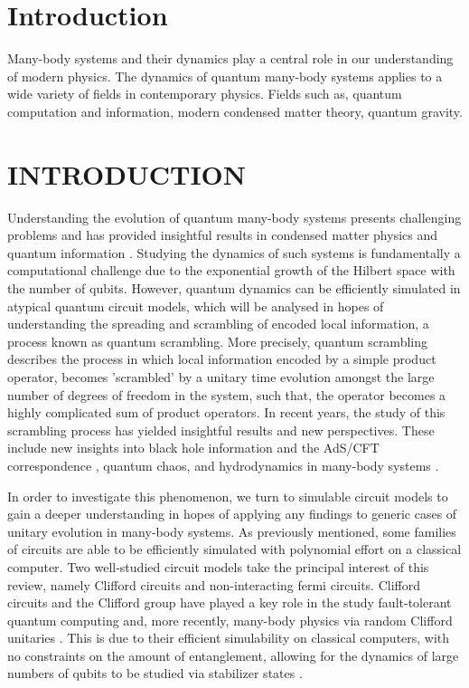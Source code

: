 \section{Introduction}


Many-body systems and their dynamics play a central role in our understanding of modern physics. 
The dynamics of quantum many-body systems applies to a wide variety of fields in contemporary physics. 
Fields such as, quantum computation and information, modern condensed matter theory, quantum gravity.


\section{INTRODUCTION}
Understanding the evolution of quantum many-body systems presents challenging problems and has
provided insightful results in condensed matter physics and quantum information \cite{Polkovnikov_2011}.
Studying the dynamics of such systems is fundamentally
a computational challenge due to the exponential growth of the Hilbert space with the number of
qubits. However, quantum dynamics can be efficiently simulated in atypical quantum circuit models,
which will be analysed in hopes of understanding the spreading and scrambling of encoded local information,
a process known as quantum scrambling. More precisely, quantum scrambling describes the
process in which local information encoded by a simple product operator, becomes 'scrambled' by a
unitary time evolution amongst the large number of degrees of freedom in the system, such that, the
operator becomes a highly complicated sum of product operators. In recent years, the study of this scrambling process has yielded insightful
results and new perspectives. These include new insights into black hole information and the
AdS/CFT correspondence \cite{Calabrese_2009,Jerusalem,Jensen_2016,https://doi.org/10.48550/arxiv.1802.01198,Sekino_2008,ShenkerBlackHolesButterfly2014, Nozaki_2014, Calabrese_2005},
quantum chaos, \cite{Maldacena_2016, https://doi.org/10.48550/arxiv.1412.6087} and hydrodynamics in many-body systems \cite{Khemani_2018, PhysRevX.8.021013, PhysRevX.8.031058,Grozdanov_2018}.

In order to investigate this phenomenon, we turn to simulable circuit models  to gain a deeper understanding in hopes of applying any findings
to generic cases of unitary
evolution in many-body systems. As previously mentioned, some families of circuits are able to be efficiently
simulated with polynomial effort on a classical computer. Two well-studied circuit models take the principal interest of
this review, namely Clifford circuits and non-interacting fermi circuits. Clifford circuits and the Clifford
group have played a key role in the study fault-tolerant quantum computing and, more recently, many-body physics via
random Clifford unitaries \cite{PhysRevB.98.205136, https://doi.org/10.48550/arxiv.2110.02988}.
This is due to their efficient simulability on classical computers, with no constraints on the amount of entanglement,
allowing for the dynamics of large numbers of qubits to be studied via stabilizer states \cite{https://doi.org/10.48550/arxiv.2210.10129}.


